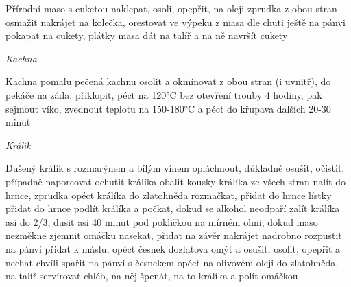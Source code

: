 \documentclass[12pt,a4paper]{article}
\begin{document}
\begin{recipe}{Přírodní maso s cuketou}
   naklepat, osoli, opepřit, na oleji zprudka z obou stran osmažit
   nakrájet na kolečka, orestovat ve výpeku z masa
   dle chuti ještě na pánvi pokapat na cukety, plátky masa dát na talíř a na ně navršít cukety
\end{recipe}
\newpage

\vspace*{\fill}
\hfill {\Huge\it Kachna}\hfill
\vspace*{\fill}
\newpage

\begin{recipe}{Kachna pomalu pečená}
   kachnu osolit a okmínovat z obou stran (i uvnitř), do pekáče na záda, přiklopit, péct na 120°C bez otevření trouby 4 hodiny, pak sejmout víko, zvednout teplotu na 150-180°C a péct do křupava dalších 20-30 minut 
\end{recipe}
\newpage

\vspace*{\fill}
\hfill {\Huge\it Králík}\hfill
\vspace*{\fill}
\newpage

\begin{recipe}{Dušený králík s rozmarýnem a bílým vínem}
   opláchnout, důkladně osušit, očistit, případně naporcovat
   ochutit králíka
   obalit kousky králíka ze všech stran
   nalít do hrnce, zprudka opéct králíka do zlatohněda
   rozmačkat, přidat do hrnce
   lístky přidat do hrnce
   podlít králíka a počkat, dokud se alkohol neodpaří
   zalít králíka asi do 2/3, dusit asi 40 minut pod pokličkou na mírném ohni, dokud maso nezměkne
   zjemnit omáčku
   nasekat, přidat na závěr
   nakrájet nadrobno
   rozpustit na pánvi
   přidat k máslu, opéct česnek dozlatova
   omýt a osušit, osolit, opepřit a nechat chvíli spařit na pánvi s česnekem
   opéct na olivovém oleji do zlatohněda, na talíř servírovat chléb, na něj špenát, na to králíka a polít omáčkou
\end{recipe}
\newpage
\end{document}
